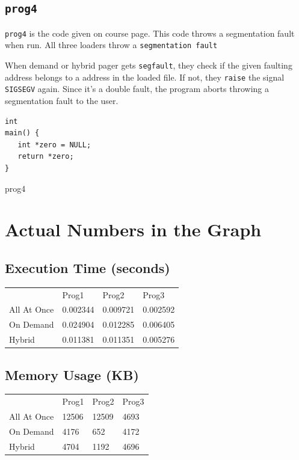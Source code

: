 \documentclass[10pt] {article}
\begin{document}
\subsection{\texttt{prog4}}  
\texttt{prog4} is the code given on course page. This code throws a segmentation fault when run. All three loaders throw a \texttt{segmentation fault}

When demand or hybrid pager gets \texttt{segfault}, they check if the given faulting address belongs to a address in the loaded file. If not, they \texttt{raise} the signal \texttt{SIGSEGV} again. Since it's a double fault, the program aborts throwing a segmentation fault to the user. 

\begin{listing}[ht!]
\begin{verbatim}
int
main() {
   int *zero = NULL;
   return *zero;
}
\end{verbatim}
\label{lst:sched}
\caption{prog4}
\end{listing}

\section {Actual Numbers in the Graph}

\subsection{Execution Time (seconds)}
\begin{tabular}{llll}

 & Prog1 & Prog2 & Prog3 \\
All At Once & 0.002344 & 0.009721 & 0.002592 \\
On Demand & 0.024904 & 0.012285 & 0.006405 \\
Hybrid & 0.011381 & 0.011351 & 0.005276 \\
\end{tabular}

\subsection{Memory Usage (KB)}

\begin{tabular}{llll}

 & Prog1 & Prog2 & Prog3 \\
All At Once & 12506 & 12509 & 4693 \\
On Demand & 4176 & 652 & 4172 \\
Hybrid & 4704 & 1192 & 4696 \\
\end{tabular}
\end{document}
